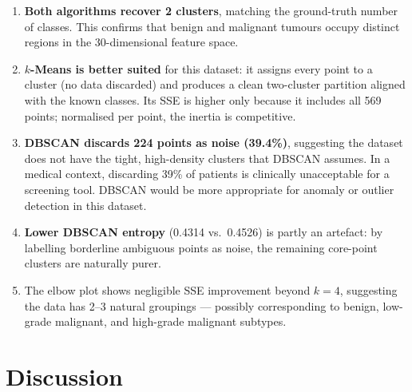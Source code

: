 \documentclass[12pt,a4paper]{article}
\begin{document}
\begin{enumerate}[leftmargin=2em]
  \item \textbf{Both algorithms recover 2 clusters}, matching the ground-truth number
        of classes.  This confirms that benign and malignant tumours occupy distinct
        regions in the 30-dimensional feature space.
  \item \textbf{$k$-Means is better suited} for this dataset: it assigns every point
        to a cluster (no data discarded) and produces a clean two-cluster partition
        aligned with the known classes.  Its SSE is higher only because it includes
        all 569 points; normalised per point, the inertia is competitive.
  \item \textbf{DBSCAN discards 224 points as noise (39.4\%)}, suggesting the dataset
        does not have the tight, high-density clusters that DBSCAN assumes.  In a
        medical context, discarding 39\% of patients is clinically unacceptable for a
        screening tool.  DBSCAN would be more appropriate for anomaly or outlier
        detection in this dataset.
  \item \textbf{Lower DBSCAN entropy} (0.4314 vs.\ 0.4526) is partly an artefact: by
        labelling borderline ambiguous points as noise, the remaining core-point
        clusters are naturally purer.
  \item The elbow plot shows negligible SSE improvement beyond $k{=}4$, suggesting
        the data has 2--3 natural groupings --- possibly corresponding to benign,
        low-grade malignant, and high-grade malignant subtypes.
\end{enumerate}

\section{Discussion}
\end{document}
